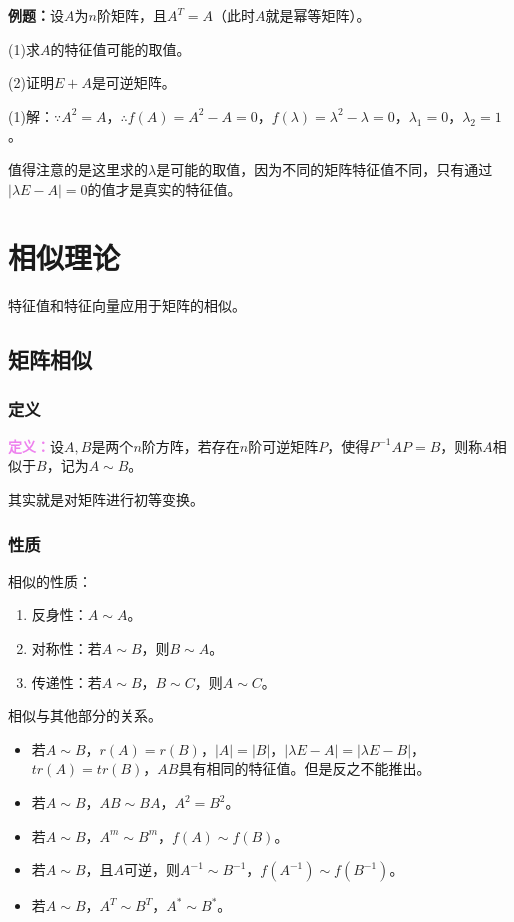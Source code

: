 \documentclass[UTF8, 12pt]{ctexart}
\begin{document}
\textbf{例题：}设$A$为$n$阶矩阵，且$A^T=A$（此时$A$就是幂等矩阵）。

(1)求$A$的特征值可能的取值。

(2)证明$E+A$是可逆矩阵。

(1)解：$\because A^2=A$，$\therefore f(A)=A^2-A=0$，$f(\lambda)=\lambda^2-\lambda=0$，$\lambda_1=0$，$\lambda_2=1$。

值得注意的是这里求的$\lambda$是可能的取值，因为不同的矩阵特征值不同，只有通过$\vert\lambda E-A\vert=0$的值才是真实的特征值。

\section{相似理论}

特征值和特征向量应用于矩阵的相似。

\subsection{矩阵相似}

\subsubsection{定义}

\textcolor{violet}{\textbf{定义：}}设$A,B$是两个$n$阶方阵，若存在$n$阶可逆矩阵$P$，使得$P^{-1}AP=B$，则称$A$相似于$B$，记为$A\sim B$。

其实就是对矩阵进行初等变换。

\subsubsection{性质}

相似的性质：

\begin{enumerate}
\item 反身性：$A\sim A$。
\item 对称性：若$A\sim B$，则$B\sim A$。
\item 传递性：若$A\sim B$，$B\sim C$，则$A\sim C$。
\end{enumerate}

相似与其他部分的关系。

\begin{itemize}
\item 若$A\sim B$，$r(A)=r(B)$，$\vert A\vert=\vert B\vert$，$\vert\lambda E-A\vert=\vert\lambda E-B\vert$，$tr(A)=tr(B)$，$AB$具有相同的特征值。但是反之不能推出。
\item 若$A\sim B$，$AB\sim BA$，$A^2=B^2$。
\item 若$A\sim B$，$A^m\sim B^m$，$f(A)\sim f(B)$。
\item 若$A\sim B$，且$A$可逆，则$A^{-1}\sim B^{-1}$，$f(A^{-1})\sim f(B^{-1})$。
\item 若$A\sim B$，$A^T\sim B^T$，$A^*\sim B^*$。
\end{itemize}
\end{document}
